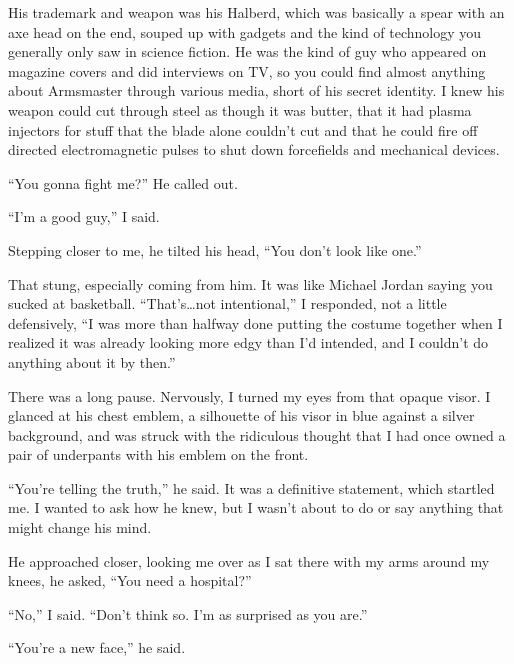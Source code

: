 His trademark and weapon was his Halberd, which was basically a spear with an axe head on the end, souped up with gadgets and the kind of technology you generally only saw in science fiction.  He was the kind of guy who appeared on magazine covers and did interviews on TV, so you could find almost anything about Armsmaster through various media, short of his secret identity.  I knew his weapon could cut through steel as though it was butter, that it had plasma injectors for stuff that the blade alone couldn't cut and that he could fire off directed electromagnetic pulses to shut down forcefields and mechanical devices.



``You gonna fight me?'' He called out.



``I'm a good guy,'' I said.



Stepping closer to me, he tilted his head, ``You don't look like one.''



That stung, especially coming from him.  It was like Michael Jordan saying you sucked at basketball.  ``That's\ldots not intentional,'' I responded, not a little defensively, ``I was more than halfway done putting the costume together when I realized it was already looking more edgy than I'd intended, and I couldn't do anything about it by then.''



There was a long pause.  Nervously, I turned my eyes from that opaque visor.  I glanced at his chest emblem, a silhouette of his visor in blue against a silver background, and was struck with the ridiculous thought that I had once owned a pair of underpants with his emblem on the front.



``You're telling the truth,'' he said.  It was a definitive statement, which startled me.  I wanted to ask how he knew, but I wasn't about to do or say anything that might change his mind.



He approached closer, looking me over as I sat there with my arms around my knees, he asked, ``You need a hospital?''



``No,'' I said. ``Don't think so.  I'm as surprised as you are.''



``You're a new face,'' he said.



